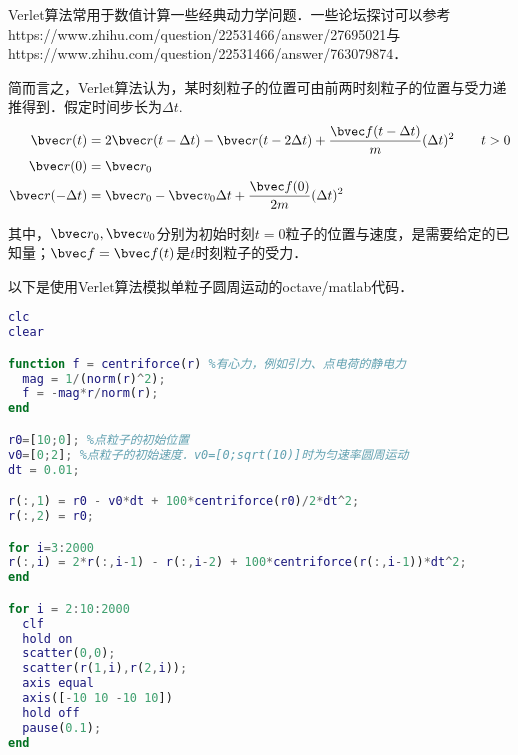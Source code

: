 

\begin{issues}
\issueNeedCite
\end{issues}

Verlet算法常用于数值计算一些经典动力学问题．一些论坛探讨可以参考https://www.zhihu.com/question/22531466/answer/27695021与https://www.zhihu.com/question/22531466/answer/763079874．

简而言之，Verlet算法认为，某时刻粒子的位置可由前两时刻粒子的位置与受力递推得到．假定时间步长为$\Delta t$.
\begin{equation}
\begin{aligned}
\bvec r (t) &= 2\bvec r(t-\Delta t) - \bvec r(t-2\Delta t) + \frac{\bvec f(t-\Delta t)}{m}(\Delta t)^2 \qquad t>0\\
\bvec r (0) &= \bvec r_0\\
\bvec r (- \Delta t) &= \bvec r_0 - \bvec v_0 \Delta t + \frac{\bvec f(0)}{2m}(\Delta t)^2\\
\end{aligned}
\end{equation}

其中，$\bvec r_0, \bvec v_0$分别为初始时刻$t=0$粒子的位置与速度，是需要给定的已知量；$\bvec f = \bvec f(t)$是$t$时刻粒子的受力．

以下是使用Verlet算法模拟单粒子圆周运动的octave/matlab代码．
\begin{lstlisting}[language=matlab]
clc
clear

function f = centriforce(r) %有心力，例如引力、点电荷的静电力
  mag = 1/(norm(r)^2);
  f = -mag*r/norm(r);
end

r0=[10;0]; %点粒子的初始位置
v0=[0;2]; %点粒子的初始速度．v0=[0;sqrt(10)]时为匀速率圆周运动
dt = 0.01;

r(:,1) = r0 - v0*dt + 100*centriforce(r0)/2*dt^2;
r(:,2) = r0;

for i=3:2000
r(:,i) = 2*r(:,i-1) - r(:,i-2) + 100*centriforce(r(:,i-1))*dt^2;
end

for i = 2:10:2000
  clf
  hold on
  scatter(0,0);
  scatter(r(1,i),r(2,i));
  axis equal
  axis([-10 10 -10 10])
  hold off
  pause(0.1);
end

\end{lstlisting}
